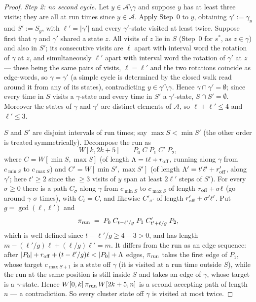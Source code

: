 \documentclass[11pt]{article}
\theoremstyle{definition}
\begin{document}
\begin{proof}
\emph{Step 2: no second cycle.} Let $y\in\mathcal A\setminus\gamma$ and
suppose $y$ has at least three visits; they are all at run times since
$y\in\mathcal A$. Apply Step~0 to $y$, obtaining $\gamma':=\gamma_y$ and
$S':=S_y$, with $\ell'=|\gamma'|$ and every $\gamma'$-state visited at least
twice. Suppose first that $\gamma$ and $\gamma'$ shared a state $z$. All
visits of $z$ lie in $S$ (Step~0 for $s^*$, as $z\in\gamma$) and also in
$S'$; its consecutive visits are $\ell$ apart with interval word the
rotation of $\gamma$ at $z$, and simultaneously $\ell'$ apart with interval
word the rotation of $\gamma'$ at $z$ --- these being the same pairs of
visits, $\ell=\ell'$ and the two rotations coincide as edge-words, so
$\gamma=\gamma'$ (a simple cycle is determined by the closed walk read
around it from any of its states), contradicting $y\in\gamma'\setminus\gamma$.
Hence $\gamma\cap\gamma'=\emptyset$; since every time in $S$ visits a
$\gamma$-state and every time in $S'$ a $\gamma'$-state, $S\cap S'=\emptyset$.
Moreover the states of $\gamma$ and $\gamma'$ are distinct elements of
$\mathcal A$, so $\ell+\ell'\le4$ and $\ell'\le3$.

$S$ and $S'$ are disjoint intervals of run times; say $\max S<\min S'$ (the
other order is treated symmetrically). Decompose the run as
\[
W[k,2k+5]\;=\;P_0\;C\;P_1\;C'\;P_2,
\]
where $C=W[\min S,\max S]$ (of length $\Lambda=t\ell+r_{\rm off}$, running
along $\gamma$ from $c_{\min S}$ to $c_{\max S}$) and
$C'=W[\min S',\max S']$ (of length $\Lambda'=t'\ell'+r'_{\rm off}$, along
$\gamma'$; here $t'\ge2$ since the $\ge3$ visits of $y$ span at least
$2\ell'$ steps of $S'$). For every $\sigma\ge0$ there is a path $C_\sigma$
along $\gamma$ from $c_{\min S}$ to $c_{\max S}$ of length
$r_{\rm off}+\sigma\ell$ (go around $\gamma$ $\sigma$ times), with $C_t=C$,
and likewise $C'_{\sigma'}$ of length $r'_{\rm off}+\sigma'\ell'$. Put
$g=\gcd(\ell,\ell')$ and
\[
\pi_{\rm run}\;=\;P_0\;C_{t-\ell'/g}\;P_1\;C'_{t'+\ell/g}\;P_2 ,
\]
which is well defined since $t-\ell'/g\ge4-3>0$, and has length
$m-(\ell'/g)\ell+(\ell/g)\ell'=m$. It differs from the run as an edge
sequence: after $|P_0|+r_{\rm off}+(t-\ell'/g)\ell<|P_0|+\Lambda$ edges,
$\pi_{\rm run}$ takes the first edge of $P_1$, whose target $c_{\max S+1}$
is a state off $\gamma$ (it is visited at a run time outside $S$), while the
run at the same position is still inside $S$ and takes an edge of $\gamma$,
whose target is a $\gamma$-state. Hence
$W[0,k]\,\pi_{\rm run}\,W[2k+5,n]$ is a second accepting path of length $n$
--- a contradiction. So every cluster state off $\gamma$ is visited at most
twice.


\end{proof}
\end{document}
